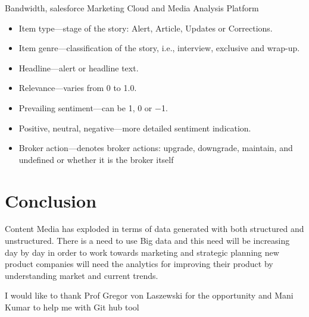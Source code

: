 \documentclass[sigconf]{acmart}
\begin{document}
Bandwidth, salesforce Marketing Cloud and Media Analysis Platform 
\begin{itemize}
\item Item type—stage of the story: Alert, Article, Updates or Corrections.
\item Item genre—classification of the story, i.e., interview, exclusive and wrap-up.
\item Headline—alert or headline text.
\item Relevance—varies from 0 to 1.0.
\item Prevailing sentiment—can be 1, 0 or −1.
\item Positive, neutral, negative—more detailed sentiment indication.
\item Broker action—denotes broker actions: upgrade, downgrade, maintain, and undefined or whether it is the broker itself
\end{itemize}

\section{Conclusion}

Content Media has exploded in terms of data generated with both structured and unstructured.
There is a need to use Big data and this need will be increasing day by day in order to work towards marketing and strategic planning new product companies will need the analytics for improving their product by understanding market and current trends.

\begin{acks}

  I would like to thank Prof  Gregor von Laszewski for the opportunity and Mani Kumar to help me with Git hub tool

\end{acks}


 
\end{document}
